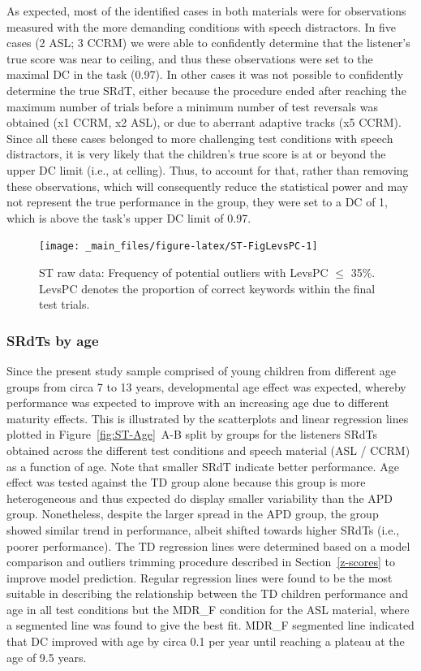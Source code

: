 \documentclass[a4paper, twoside]{templates/ociamthesis}
\begin{document}
As expected, most of the identified cases in both materials were for observations measured with the more demanding conditions with speech distractors. In five cases (2 ASL; 3 CCRM) we were able to confidently determine that the listener's true score was near to ceiling, and thus these observations were set to the maximal DC in the task (0.97). In other cases it was not possible to confidently determine the true SRdT, either because the procedure ended after reaching the maximum number of trials before a minimum number of test reversals was obtained (x1 CCRM, x2 ASL), or due to aberrant adaptive tracks (x5 CCRM). Since all these cases belonged to more challenging test conditions with speech distractors, it is very likely that the children's true score is at or beyond the upper DC limit (i.e., at celling). Thus, to account for that, rather than removing these observations, which will consequently reduce the statistical power and may not represent the true performance in the group, they were set to a DC of 1, which is above the task's upper DC limit of 0.97.\\

\begin{figure}
\texttt{[image: \_main\_files/figure-latex/ST-FigLevsPC-1]} \caption{ST raw data: Frequency of potential outliers with LevsPC $\leq$ 35\%. LevsPC denotes the proportion of correct keywords within the final test trials.}\label{fig:ST-FigLevsPC}
\end{figure}

\hypertarget{srdts-by-age}{%
\subsubsection*{SRdTs by age}\label{srdts-by-age}}

Since the present study sample comprised of young children from different age groups from circa 7 to 13 years, developmental age effect was expected, whereby performance was expected to improve with an increasing age due to different maturity effects. This is illustrated by the scatterplots and linear regression lines plotted in Figure~\ref{fig:ST-Age}~A-B split by groups for the listeners SRdTs obtained across the different test conditions and speech material (ASL / CCRM) as a function of age. Note that smaller SRdT indicate better performance. Age effect was tested against the TD group alone because this group is more heterogeneous and thus expected do display smaller variability than the APD group. Nonetheless, despite the larger spread in the APD group, the group showed similar trend in performance, albeit shifted towards higher SRdTs (i.e., poorer performance). The TD regression lines were determined based on a model comparison and outliers trimming procedure described in Section~\ref{z-scores} to improve model prediction. Regular regression lines were found to be the most suitable in describing the relationship between the TD children performance and age in all test conditions but the MDR\_F condition for the ASL material, where a segmented line was found to give the best fit. MDR\_F segmented line indicated that DC improved with age by circa 0.1 per year until reaching a plateau at the age of 9.5 years.\\
\end{document}
